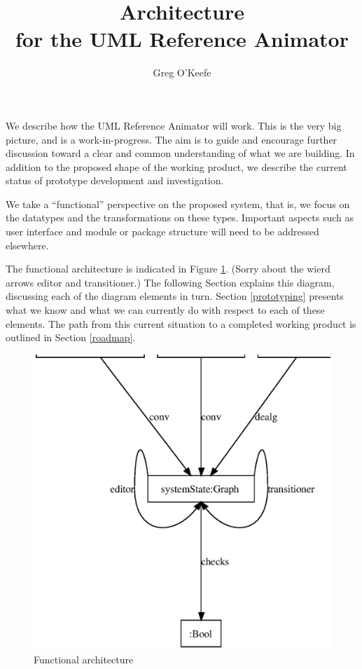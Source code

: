\documentclass[a4paper]{article}
\title{{\bf Architecture} \\
  for the UML Reference Animator}
\author{Greg O'Keefe}
\begin{document}
\maketitle 


We describe how the UML Reference Animator will work.  This is the
very big picture, and is a work-in-progress.  The aim is to guide and
encourage further discussion toward a clear and common understanding
of what we are building.  In addition to the proposed shape of the
working product, we describe the current status of prototype
development and investigation.

We take a ``functional'' perspective on the proposed system, that is,
we focus on the datatypes and the transformations on these types.
Important aspects such as user interface and module or package
structure will need to be addressed elsewhere.

The functional architecture is indicated in Figure \ref{figArch}.
(Sorry about the wierd arrows {\sf editor} and {\sf transitioner}.)
The following Section explains this diagram, discussing each of the
diagram elements in turn.  Section \ref{prototyping} presents what we
know and what we can currently do with respect to each of these
elements.  The path from this current situation to a completed working
product is outlined in Section \ref{roadmap}.

\begin{figure}
\begin{center}
\includegraphics{architectureFig.ps}
\end{center}
\caption{Functional architecture}
\label{figArch}
\end{figure}
\end{document}
